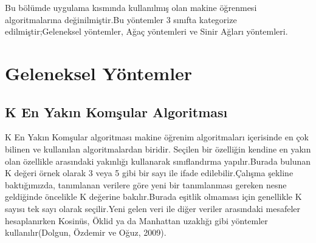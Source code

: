 \documentclass[12pt,twoside]{deuthesis}
\begin{document}
Bu bölümde uygulama kısmında kullanılmış olan makine öğrenmesi algoritmalarına değinilmiştir.Bu yöntemler 3 sınıfta kategorize edilmiştir;Geleneksel yöntemler, Ağaç yöntemleri ve Sinir Ağları yöntemleri.

\hypertarget{geleneksel-yuxf6ntemler}{%
\section{Geleneksel Yöntemler}\label{geleneksel-yuxf6ntemler}}

\hypertarget{k-en-yakux131n-komux15fular-algoritmasux131}{%
\subsection{K En Yakın Komşular Algoritması}\label{k-en-yakux131n-komux15fular-algoritmasux131}}

K En Yakın Komşular algoritması makine öğrenim algoritmaları içerisinde en çok bilinen ve kullanılan algoritmalardan biridir. Seçilen bir özelliğin kendine en yakın olan özellikle arasındaki yakınlığı kullanarak sınıflandırma yapılır.Burada bulunan K değeri örnek olarak 3 veya 5 gibi bir sayı ile ifade edilebilir.Çalışma şekline baktığımızda, tanımlanan verilere göre yeni bir tanımlanması gereken nesne geldiğinde öncelikle K değerine bakılır.Burada eşitlik olmaması için genellikle K sayısı tek sayı olarak seçilir.Yeni gelen veri ile diğer veriler arasındaki mesafeler hesaplanırken Kosinüs, Öklid ya da Manhattan uzaklığı gibi yöntemler kullanılır(Dolgun, Özdemir ve Oğuz, 2009).
\end{document}
